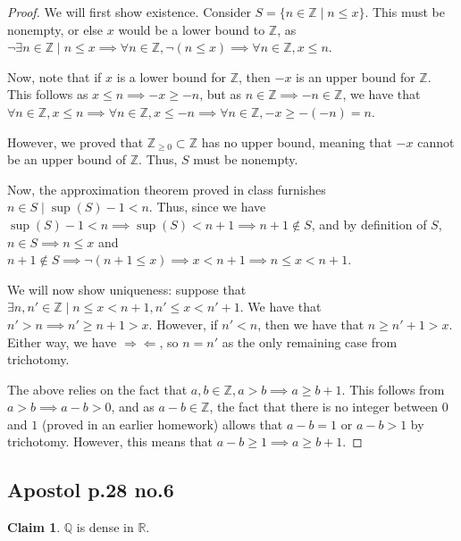 \documentclass[12pt,letterpaper]{article}
\theoremstyle{definition}
\newtheorem*{claim}{Claim}
\newcommand{\contra}{\Rightarrow\!\Leftarrow}
\newcommand{\R}{\mathbb{R}}
\newcommand{\Z}{\mathbb{Z}}
\newcommand{\Ze}{\mathbb{Z}_{\geq 0}}
\newcommand{\Q}{\mathbb{Q}}
\begin{document}
\begin{proof}
  We will first show existence. Consider $S = \{n \in \Z \mid n \leq x\}$. This
  must be nonempty, or else $x$ would be a lower bound to $\Z$, as $\neg \exists
  n \in \Z \mid n \leq x \implies \forall n \in \Z, \neg(n \leq x) \implies
  \forall n \in \Z, x \leq n$.

  Now, note that if $x$ is a lower bound for $\Z$, then $-x$ is an upper bound
  for $\Z$. This follows as $x \leq n \implies -x \geq -n$, but as $n \in \Z \implies
  -n \in \Z$, we have that $\forall n \in \Z, x \leq n \implies \forall n \in
  \Z, x \leq -n \implies \forall n \in \Z, -x \geq -(-n) = n$.

  However, we proved that $\Ze \subset \Z$ has no upper bound, meaning that $-x$
  cannot be an upper bound of $\Z$. Thus, $S$ must be nonempty.

  Now, the approximation theorem proved in class furnishes $n \in S \mid
  \sup(S) - 1 < n$. Thus, since we have $\sup(S) - 1 < n \implies \sup(S) < n +
  1 \implies n + 1 \notin S$, and by definition of $S$, $n \in S \implies n \leq x$
  and $n+1 \notin S \implies \neg(n + 1 \leq x) \implies x < n + 1 \implies n
  \leq x < n+1$.

  We will now show uniqueness: suppose that $\exists n, n' \in \Z \mid n \leq x
  < n+1, n' \leq x < n'+1$. We have that $n' > n \implies n' \geq n + 1 > x$. However, if $n' <
  n$, then we have that $n \geq n' + 1 > x$. Either way, we have $\contra$, so
  $n = n'$ as the only remaining case from trichotomy.

  The above relies on the fact that $a,b \in \Z, a > b \implies a \geq b + 1$.
  This follows from $a > b \implies a - b > 0$, and as $a - b \in \Z$,
  the fact that there is no integer between $0$ and $1$ (proved in an earlier
  homework) allows that $a - b = 1$ or $a - b > 1$ by trichotomy. However, this
  means that $a-b \geq 1 \implies a \geq b + 1$.
\end{proof}

\subsection*{Apostol p.28 no.6}

\begin{claim}
  $\Q$ is dense in $\R$.
\end{claim}
\end{document}
